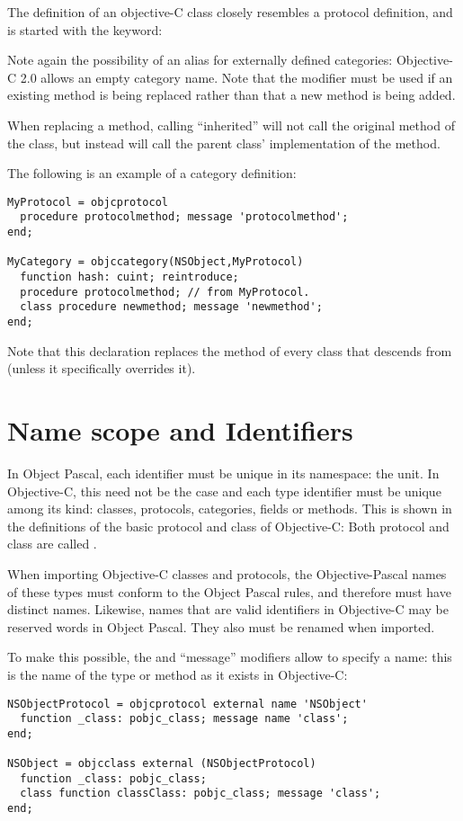 The definition of an objective-C class closely resembles a protocol
definition, and is started with the  keyword:

Note again the possibility of an alias for externally defined categories:
Objective-C 2.0 allows an empty category name. Note that the
 modifier must be used if an existing method is being replaced
rather than that a new method is being added.

When replacing a method, calling ``inherited'' will not call the original
method of the class, but instead will call the parent class' implementation
of the method.

The following is an example of a category definition:
\begin{verbatim}
MyProtocol = objcprotocol
  procedure protocolmethod; message 'protocolmethod';
end;

MyCategory = objccategory(NSObject,MyProtocol)
  function hash: cuint; reintroduce;
  procedure protocolmethod; // from MyProtocol.
  class procedure newmethod; message 'newmethod';
end;
\end{verbatim}
Note that this declaration replaces the  method of every class
that descends from  (unless it specifically overrides it).

\section{Name scope and Identifiers}
In Object Pascal, each identifier must be unique in its namespace: the unit.
In Objective-C, this need not be the case and each type identifier must be
unique among its kind: classes, protocols, categories, fields or methods.
This is shown in the definitions of the basic protocol and class of
Objective-C: Both protocol and class are called .

When importing Objective-C classes and protocols, the Objective-Pascal
names of these types must conform to the Object Pascal rules, and therefore
must have distinct names. Likewise, names that are valid identifiers in
Objective-C may be reserved words in Object Pascal. They also must be
renamed when imported.

To make this possible, the  and ``message'' modifiers allow
to specify a name: this is the name of the type or method as it exists
in Objective-C:
\begin{verbatim}
NSObjectProtocol = objcprotocol external name 'NSObject'
  function _class: pobjc_class; message name 'class';
end;

NSObject = objcclass external (NSObjectProtocol)
  function _class: pobjc_class;
  class function classClass: pobjc_class; message 'class';
end;
\end{verbatim}


